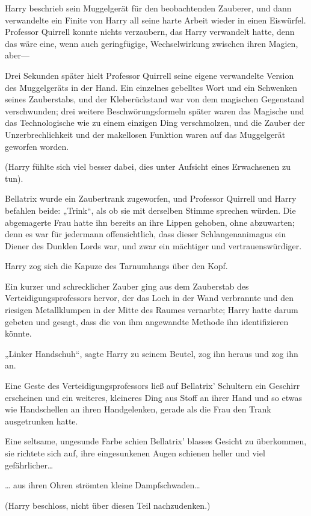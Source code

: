 {Harry beschrieb sein Muggelgerät für den beobachtenden Zauberer, und dann verwandelte ein Finite von Harry all seine harte Arbeit wieder in einen Eiswürfel. Professor Quirrell konnte nichts verzaubern, das Harry verwandelt hatte, denn das wäre eine, wenn auch geringfügige, Wechselwirkung zwischen ihren Magien, aber—

Drei Sekunden später hielt Professor Quirrell seine eigene verwandelte Version des Muggelgeräts in der Hand. Ein einzelnes gebelltes Wort und ein Schwenken seines Zauberstabs, und der Kleberückstand war von dem magischen Gegenstand verschwunden; drei weitere Beschwörungsformeln später waren das Magische und das Technologische wie zu einem einzigen Ding verschmolzen, und die Zauber der Unzerbrechlichkeit und der makellosen Funktion waren auf das Muggelgerät geworfen worden.

(Harry fühlte sich viel besser dabei, dies unter Aufsicht eines Erwachsenen zu tun).

Bellatrix wurde ein Zaubertrank zugeworfen, und Professor Quirrell und Harry befahlen beide: „Trink“, als ob sie mit derselben Stimme sprechen würden. Die abgemagerte Frau hatte ihn bereits an ihre Lippen gehoben, ohne abzuwarten; denn es war für jedermann offensichtlich, dass dieser Schlangenanimagus ein Diener des Dunklen Lords war, und zwar ein mächtiger und vertrauenswürdiger.

Harry zog sich die Kapuze des Tarnumhangs über den Kopf.

Ein kurzer und schrecklicher Zauber ging aus dem Zauberstab des Verteidigungsprofessors hervor, der das Loch in der Wand verbrannte und den riesigen Metallklumpen in der Mitte des Raumes vernarbte; Harry hatte darum gebeten und gesagt, dass die von ihm angewandte Methode ihn identifizieren könnte.

„Linker Handschuh“, sagte Harry zu seinem Beutel, zog ihn heraus und zog ihn an.

Eine Geste des Verteidigungsprofessors ließ auf Bellatrix' Schultern ein Geschirr erscheinen und ein weiteres, kleineres Ding aus Stoff an ihrer Hand und so etwas wie Handschellen an ihren Handgelenken, gerade als die Frau den Trank ausgetrunken hatte.

Eine seltsame, ungesunde Farbe schien Bellatrix' blasses Gesicht zu überkommen, sie richtete sich auf, ihre eingesunkenen Augen schienen heller und viel gefährlicher…

… aus ihren Ohren strömten kleine Dampfschwaden…

(Harry beschloss, nicht über diesen Teil nachzudenken.)

}
